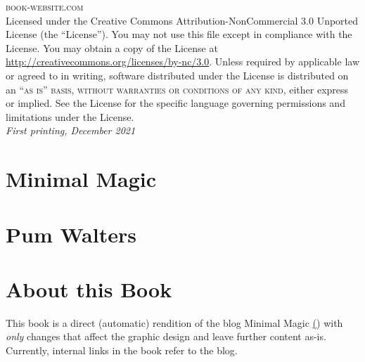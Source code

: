 	\noindent \textsc{book-website.com}\\ %

	\noindent Licensed under the Creative Commons Attribution-NonCommercial 3.0 Unported License (the ``License''). You may not use this file except in compliance with the License. You may obtain a copy of the License at \url{http://creativecommons.org/licenses/by-nc/3.0}. Unless required by applicable law or agreed to in writing, software distributed under the License is distributed on an \textsc{``as is'' basis, without warranties or conditions of any kind}, either express or implied. See the License for the specific language governing permissions and limitations under the License.\\ %

	\noindent \textit{First printing, December 2021} %






\chapter{Minimal Magic}


\chapter{Pum Walters}


\chapter{About this Book}

This book is a direct (automatic) rendition of the blog Minimal Magic 
\href{https://www.minimalmagic.blog/}() with \emph{only} changes that affect 
the graphic design and leave further content as-is. Currently, internal links 
in the book refer to the blog.

